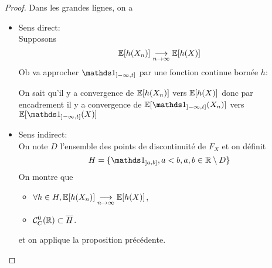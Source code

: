 \begin{proof}
    Dans les grandes lignes, on a
    \begin{itemize}[\ptr{}]
        \item Sens direct:\\
        Supposons 
        \begin{equation*}
            \mathbb{E}[h(X_n)] \underset{n\to\infty}{\longrightarrow} \mathbb{E}[h(X)]
        \end{equation*}
        Ob va approcher \(\one_{\of{-\infty,t}}\) par une fonction
        continue bornée \(h\):
%
%

        On sait qu'il y a convergence de \(\mathbb{E}[h(X_n)]\) vers \(\mathbb{E}[h(X)]\)
        donc par encadrement il y a convergence de \(\bb E[\one_{\of{-\infty,t}}(X_n)]\)
        vers \(\bb E[\one_{\of{-\infty,t}}(X)]\)

        \item Sens indirect:\\
        On note \(D\) l'ensemble des points de discontinuité de \(F_X\) et
        on définit
        \begin{equation*}
            H=\{\one_{\of{a,b}},a<b,a,b\in\bb R\setminus D\}
        \end{equation*}
        On montre que
        \begin{itemize}[]
            \item \(\forall h\in H,\mathbb{E}[h(X_n)] \underset{n\to\infty}{\longrightarrow} \mathbb{E}[h(X)]\),
            \item \(\mathcal C_C^0(\mathbb{R})\subset \overline{H}\).
        \end{itemize}
        et on applique la proposition précédente.
    \end{itemize}
\end{proof}

